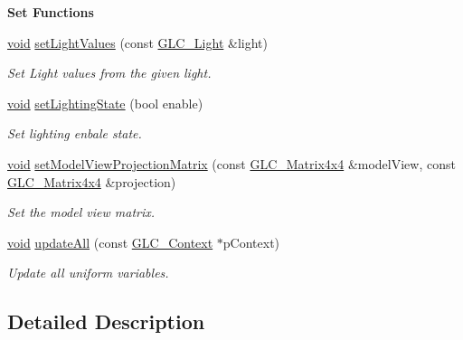 \begin{Indent}{\bf Set Functions}\par
\begin{DoxyCompactItemize}
\item 
\hyperlink{group___u_a_v_objects_plugin_ga444cf2ff3f0ecbe028adce838d373f5c}{void} \hyperlink{class_g_l_c___uniform_shader_data_aee008d2e5eb40abb4bb88357af38e00f}{set\-Light\-Values} (const \hyperlink{class_g_l_c___light}{G\-L\-C\-\_\-\-Light} \&light)
\begin{DoxyCompactList}\small\item\em Set Light values from the given light. \end{DoxyCompactList}\item 
\hyperlink{group___u_a_v_objects_plugin_ga444cf2ff3f0ecbe028adce838d373f5c}{void} \hyperlink{class_g_l_c___uniform_shader_data_a7a499dbd3bf6c213775ca2b72e1efdfb}{set\-Lighting\-State} (bool enable)
\begin{DoxyCompactList}\small\item\em Set lighting enbale state. \end{DoxyCompactList}\item 
\hyperlink{group___u_a_v_objects_plugin_ga444cf2ff3f0ecbe028adce838d373f5c}{void} \hyperlink{class_g_l_c___uniform_shader_data_a467d196ba705a6087651037d8f8d9f33}{set\-Model\-View\-Projection\-Matrix} (const \hyperlink{class_g_l_c___matrix4x4}{G\-L\-C\-\_\-\-Matrix4x4} \&model\-View, const \hyperlink{class_g_l_c___matrix4x4}{G\-L\-C\-\_\-\-Matrix4x4} \&projection)
\begin{DoxyCompactList}\small\item\em Set the model view matrix. \end{DoxyCompactList}\item 
\hyperlink{group___u_a_v_objects_plugin_ga444cf2ff3f0ecbe028adce838d373f5c}{void} \hyperlink{class_g_l_c___uniform_shader_data_a298d352a0181771b74ea5245866c1b0a}{update\-All} (const \hyperlink{class_g_l_c___context}{G\-L\-C\-\_\-\-Context} $\ast$p\-Context)
\begin{DoxyCompactList}\small\item\em Update all uniform variables. \end{DoxyCompactList}\end{DoxyCompactItemize}
\end{Indent}


\subsection{Detailed Description}


